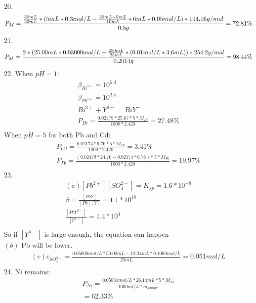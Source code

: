 \documentclass{article}
\begin{document}
20.\begin{equation}
    P_{M} = \frac{\frac{50mL}{20mL}*(5mL*0.3mol/L - \frac{20mL+5mL}{10mL}*6mL*0.05mol/L)*194.16g/mol}{0.5g} = 72.81\%\\
\end{equation}
21.
\begin{equation}
    P_{M} = \frac{2*(25.00mL * 0.03000mol/L - \frac{250mL}{25mL}*(0.01mol/L* 3.6mL)) * 254.2 g/mol}{0.2014 g} = 98.44\%\\
\end{equation}
22. When $pH = 1$:\\
\begin{equation}
    \begin{multlined}
        \beta_{Bi^{3+}} = 10^{5.3}\\
        \beta_{Pb^{2+}} = 10^{2.4}\\
        Bi^{3+} + Y^{4-} = BiY^-\\
        P_{Bi} = \frac{0.02479 * 25.67 * 5 * M_{Bi}}{1000 * 2.420} = 27.48\%\\
    \end{multlined}
\end{equation}
When $pH = 5$ for both Pb and Cd:\\
\begin{equation}
    \begin{multlined}
        P_{Cd} = \frac{0.02174 * 6.76 * 5 * M_{Pb}}{1000 * 2.420} = 3.41\%\\
        P_{Pb} = \frac{(0.02479 * 24.76 - 0.02174 * 6.76) * 5 * M_{Pb}}{1000 * 2.420} = 19.97\%\\
    \end{multlined}
\end{equation}
23.\begin{equation}
    \begin{multlined}
        (a) [Pb^{2+}][SO_4^{2-}] = K_{sp} = 1.6 * 10^{-8}\\
        \beta = \frac{[PbY]}{[Pb][Y]} = 1.1*10^{18}\\
        \frac{[PbY^{2-}]}{[Y^{4-}]} = 1.4*10^4\\
    \end{multlined}
\end{equation}
So if $[Y^{4-}]$ is large enough, the equation can happen\\
$(b)$ Pb will be lower.\\
\begin{equation}
    \begin{multlined}
        (c) c_{SO_4^{2-}} = \frac{0.05000mol/L*50.00mL - 12.24mL* 0.1000mol/L}{25mL} = 0.051 mol/L\\
    \end{multlined}
\end{equation}
24. Ni remains:\\
\begin{equation}
    \begin{multlined}
        P_{Ni} = \frac{0.05831 mol/L * 26.14 mL * 5 * M_{Ni}}{1000ml/L * m_{sample}}\\
        = 62.33\%\\
    \end{multlined}
\end{equation}
\end{document}
